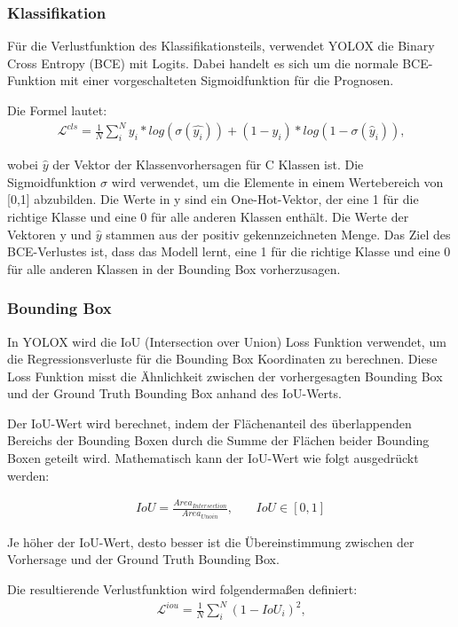 \subsubsection{Klassifikation}\label{chap:yoloxClassification}
Für die Verlustfunktion des Klassifikationsteils, verwendet YOLOX die Binary Cross Entropy (BCE) mit Logits. Dabei handelt es sich um die normale BCE-Funktion mit einer vorgeschalteten Sigmoidfunktion für die Prognosen.

Die Formel lautet:
\begin{align}
	\mathcal{L}^{cls}=\frac{1}{N}\sum_{i}^{N}y_i*log(\sigma(\hat{y_i}))+(1-y_i)*log(1-\sigma(\hat{y}_i))\text{,}
\end{align}

wobei $\hat{y}$ der Vektor der Klassenvorhersagen für C Klassen ist. Die Sigmoidfunktion $\sigma$ wird verwendet, um die Elemente in einem Wertebereich von [0,1] abzubilden. Die Werte in y sind ein One-Hot-Vektor, der eine 1 für die richtige Klasse und eine 0 für alle anderen Klassen enthält. Die Werte der Vektoren y und $\hat{y}$ stammen aus der positiv gekennzeichneten Menge. Das Ziel des BCE-Verlustes ist, dass das Modell lernt, eine 1 für die richtige Klasse und eine 0 für alle anderen Klassen in der Bounding Box vorherzusagen. \cite{yoloxExplanationHowWorks}

\subsubsection{Bounding Box}
In YOLOX wird die IoU (Intersection over Union) Loss Funktion verwendet, um die Regressionsverluste für die Bounding Box Koordinaten zu berechnen. Diese Loss Funktion misst die Ähnlichkeit zwischen der vorhergesagten Bounding Box und der Ground Truth Bounding Box anhand des IoU-Werts.

Der IoU-Wert wird berechnet, indem der Flächenanteil des überlappenden Bereichs der Bounding Boxen durch die Summe der Flächen beider Bounding Boxen geteilt wird. Mathematisch kann der IoU-Wert wie folgt ausgedrückt werden:

\begin{align}
	IoU = \frac{Area_{Intersection}}{Area_{Unoin}}\text{,} \qquad IoU \in [0,1]
\end{align}

Je höher der IoU-Wert, desto besser ist die Übereinstimmung zwischen der Vorhersage und der Ground Truth Bounding Box.

Die resultierende Verlustfunktion wird folgendermaßen definiert:
\begin{align}
	\mathcal{L}^{iou} = \frac{1}{N}\sum_{i}^{N}(1-IoU_i)^2 \text{,}
\end{align}

